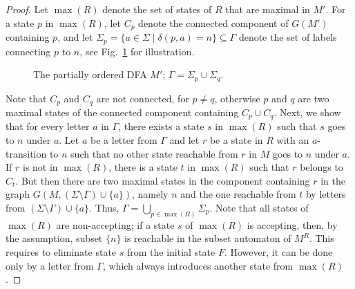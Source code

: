 \documentclass[runningheads]{llncs}
\begin{document}
\begin{proof}
    Let $\max(R)$ denote the set of states of $R$ that are maximal in $M'$.
    For a state $p$ in $\max(R)$, let $C_{p}$ denote the connected component of $G(M')$ containing $p$,
    and let $\Sigma_p=\{a\in\Sigma \mid \delta(p,a)=n\}\subseteq\Gamma$ denote the set of labels connecting $p$ to $n$, see Fig.~\ref{fig:tree} for illustration.
    \begin{figure}[t]
      \centering
      \caption{The partially ordered DFA $M'$; $\Gamma=\Sigma_p\cup\Sigma_q$.}
      \label{fig:tree}
    \end{figure}
    Note that $C_p$ and $C_q$ are not connected, for $p\neq q$, otherwise $p$ and $q$ are two maximal states of the connected component containing $C_p\cup C_q$. Next, we show that for every letter $a$ in $\Gamma$, there exists a state $s$ in $\max(R)$ such that $s$ goes to $n$ under $a$.
    Let $a$ be a letter from $\Gamma$ and let $r$ be a state in $R$ with an $a$-transition to $n$ such that no other state reachable from $r$ in $M$ goes to $n$ under $a$. If $r$ is not in $\max(R)$, there is a state $t$ in $\max(R)$ such that $r$ belongs to $C_t$. But then there are two maximal states in the component containing $r$ in the graph $G(M,(\Sigma\setminus\Gamma)\cup\{a\})$, namely $n$ and the one reachable from $t$ by letters from $(\Sigma\setminus\Gamma)\cup\{a\}$. Thus, $\Gamma = \bigcup_{p\in\max(R)} \Sigma_p$.
Note that all states of $\max(R)$ are non-accepting; if a state $s$ of $\max(R)$ is accepting, then, by the assumption, subset $\{n\}$ is reachable in the subset automaton of $M^R$. This requires to eliminate state $s$ from the initial state $F$. However, it can be done only by a letter from $\Gamma$, which always introduces another state from $\max(R)$.
    

\end{proof}
\end{document}
